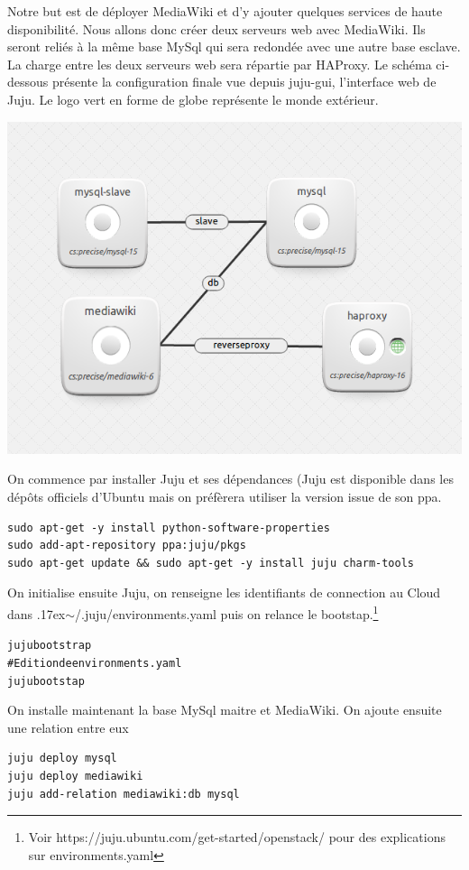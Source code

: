 \documentclass[a4paper,oneside]{report}
\begin{document}
Notre but est de déployer MediaWiki et d'y ajouter quelques services de haute disponibilité. Nous allons donc créer deux serveurs web avec MediaWiki. Ils seront reliés à la même base MySql qui sera redondée avec une autre base esclave. La charge entre les deux serveurs web sera répartie par HAProxy. Le schéma ci-dessous présente la configuration finale vue depuis juju-gui, l'interface web de Juju. Le logo vert en forme de globe représente le monde extérieur.
\begin{center}
\includegraphics[scale=0.75]{images/butJuju.png}
\end{center}

On commence par installer Juju et ses dépendances (Juju est disponible dans les dépôts officiels d'Ubuntu mais on préfèrera utiliser la version issue de son \gls{ppa}.
\begin{verbatim}
sudo apt-get -y install python-software-properties
sudo add-apt-repository ppa:juju/pkgs
sudo apt-get update && sudo apt-get -y install juju charm-tools
\end{verbatim}

On initialise ensuite Juju, on renseigne les identifiants de connection au Cloud dans {\raise.17ex\hbox{$\scriptstyle\sim$}}/.juju/environments.yaml puis on relance le bootstap.\footnote{Voir https://juju.ubuntu.com/get-started/openstack/ pour des explications sur environments.yaml}
\begin{alltt}
juju bootstrap
# Edition de environments.yaml
juju bootstap
\end{alltt}

On installe maintenant la base MySql maitre et MediaWiki. On ajoute ensuite une relation entre eux
\begin{verbatim}
juju deploy mysql
juju deploy mediawiki
juju add-relation mediawiki:db mysql
\end{verbatim}
\end{document}
